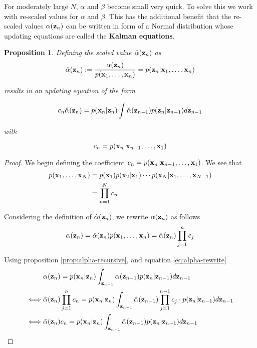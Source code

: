 \documentclass[11pt]{article}
\numberwithin{equation}{section}
\newcommand{\x}{{\bf x}}
\newcommand{\z}{{\bf z}}
\newtheorem{proposition}{Proposition}[section]
\begin{document}
For moderately large $N$, $\alpha$ and $\beta$ become small very quick. To solve this we work with re-scaled values for $\alpha$ and $\beta$. This has the additional benefit that the re-scaled values $\alpha(\z_n)$ can be written in form of a Normal distribution whose updating equations are  called the \textbf{Kalman equations}.


\begin{proposition} \label{prop:alpha-hat}
	Defining the scaled value $\hat\alpha(\z_n)$ as
	\begin{equation}
		\hat\alpha(\z_n) := \frac{\alpha(\z_n)}{p(\x_1, \ldots, \x_n)} = p(\z_n \vert \x_1, \ldots, \x_n)
	\end{equation}
	
	results in an updating equation of the form
	
	\begin{equation}
		 c_n \hat\alpha(\z_n) = p(\x_n\vert\z_n)\int \hat\alpha(\z_{n-1})p(\z_n \vert \z_{n-1}) d\z_{n-1}
	\end{equation}
	
	with
	
	\begin{equation}
		c_n = p(\x_n \vert \x_{n-1}, \ldots, \x_1)
	\end{equation}
\end{proposition}

\begin{proof}
	We begin defining the coefficient $c_n = p(\x_n \vert \x_{n-1}, \ldots, \x_1)$. We see that
	\begin{align}
		p(\x_1, \ldots, \x_N) &=  p(\x_1) p(\x_2 \vert \x_1) \cdots p(\x_N \vert \x_1, \ldots, \x_{N-1})\\
		&= \prod_{n=1}^N c_n
	\end{align}
	
	Considering the definition of $\hat\alpha(\z_n)$, we rewrite $\alpha(\z_n)$ as follows
	\begin{equation} \label{eq:alpha-rewrite}
		\alpha(\z_n) = \hat\alpha(\z_n) p(\x_1, \ldots, \x_n) = \hat\alpha(\z_n) \prod_{j=1}^n c_j
	\end{equation}
	
	Using proposition \ref{prop:alpha-recursive}, and equation \ref{eq:alpha-rewrite}
	\begin{align}
		&\alpha(\z_n) = p(\x_n\vert \z_n) \int_{\z_{n-1}} \alpha(\z_{n-1})p(\z_n\vert\z_{n-1}) d\z_{n-1}\\
		\iff & \hat\alpha(\z_n) \prod_{j=1}^{n} c_n = p(\x_n \vert \z_n) \int_{\z_{n-1}} \hat\alpha(\z_{n-1}) \prod_{j=1}^{n-1} c_j \cdot  p(\z_n\vert\z_{n-1}) d\z_{n-1}\\
		\iff & \hat\alpha(\z_n) c_n =   p(\x_n \vert \z_n) \int_{\z_{n-1}} \hat\alpha(\z_{n-1})   p(\z_n\vert\z_{n-1}) d\z_{n-1}
	\end{align}
	
	
\end{proof}
\end{document}
